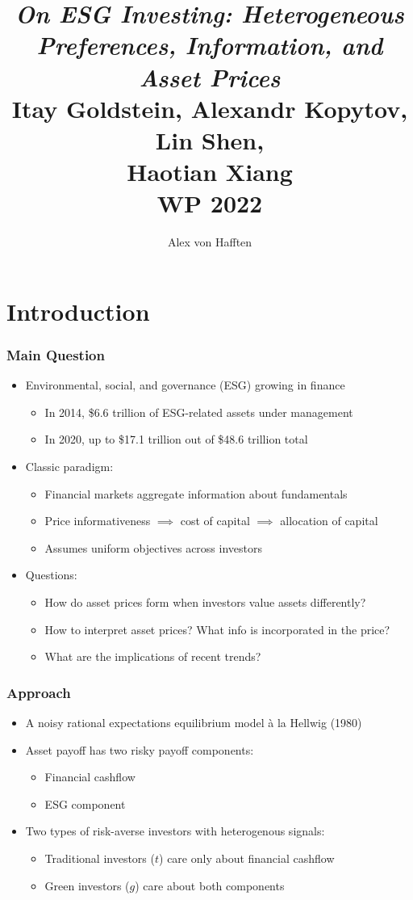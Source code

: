 \documentclass[handout]{beamer}
\title[Goldstein et al. ``On ESG Investing"]{\textit{On ESG Investing: Heterogeneous Preferences, Information, and Asset Prices} \\ Itay Goldstein, Alexandr Kopytov, Lin Shen, \\Haotian Xiang \\WP 2022}
\author{Alex von Hafften}
\institute{UW-Madison}
\begin{document}
\section{Introduction}

\begin{frame}
\titlepage
\end{frame}

\begin{frame}
\frametitle{Main Question}
\begin{itemize}[<+->]
\item Environmental, social, and governance (ESG) growing in finance
\begin{itemize}[<+->]
\item In 2014, \$6.6 trillion of ESG-related assets under management
\item In 2020, up to \$17.1 trillion out of \$48.6 trillion total
\end{itemize}
\bigskip
\item Classic paradigm:
\begin{itemize}[<+->]
\item Financial markets aggregate information about fundamentals
\item Price informativeness $\implies$ cost of capital $\implies$ allocation of capital
\item Assumes uniform objectives across investors
\end{itemize}
\bigskip
\item Questions:
\begin{itemize}[<+->]
\item How do asset prices form when investors value assets differently?
\item How to interpret asset prices? What info is incorporated in the price?
\item What are the implications of recent trends?
\end{itemize}
\end{itemize}
\end{frame}


\begin{frame}
\frametitle{Approach}
\begin{itemize}[<+->]
\item A noisy rational expectations equilibrium model \`a la Hellwig (1980)
\bigskip
\item Asset payoff has two risky payoff components:
\begin{itemize}[<+->]
\item Financial cashflow 
\item ESG component
\end{itemize}
\bigskip
\item Two types of risk-averse investors with heterogenous signals:
\begin{itemize}[<+->]
\item Traditional investors ($t$) care only about financial cashflow
\item Green investors ($g$) care about both components
\end{itemize}
\end{itemize}
\end{frame}
\end{document}
